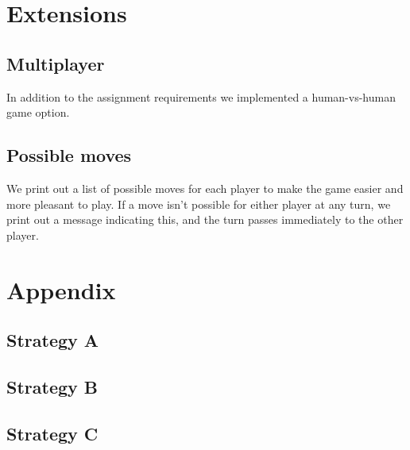 \documentclass[12pt]{article}
\begin{document}
\section{Extensions}

\subsection{Multiplayer}
In addition to the assignment requirements we implemented a human-vs-human game option.

\subsection{Possible moves}
We print out a list of possible moves for each player to make the game easier and more pleasant to play.
If a move isn't possible for either player at any turn, we print out a message indicating this, and the
turn passes immediately to the other player.

\section{Appendix}

\subsection{Strategy A}

\subsection{Strategy B}

\subsection{Strategy C}



\end{document}
